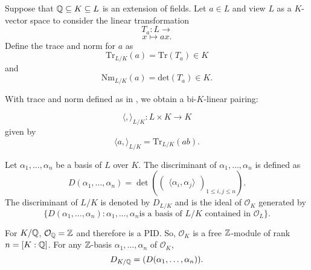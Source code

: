 
\begin{definition}
    Suppose that $\mathbb{Q} \subseteq K \subseteq L$ is an extension of fields. Let $a \in L$ and view $L$ as a $K$-vector space to consider the linear transformation
        \[T_a: L \to \]
        \[x\mapsto ax. \]
    Define the trace and norm for $a$ as
        \[\textrm{Tr}_{L/K}(a) = \textrm{Tr}(T_a) \in K\]
    and
        \[\textrm{Nm}_{L/K}(a) = \textrm{det}(T_a) \in K.\]
\end{definition}

With trace and norm defined as in , we obtain a bi-$K$-linear pairing:

    \[\langle , \rangle_{L/K}: L \times K \to K\]
given by
    \[\langle a, \rangle_{L/K} = \textrm{Tr}_{L/K}(ab).\]
\begin{definition}
    Let $\alpha_1, \ldots, \alpha_n$ be a basis of $L$ over $K$. The discriminant of $\alpha_1, \ldots, \alpha_n$ is defined as
        \[D(\alpha_1, \ldots, \alpha_n) = \det\left(\begin{pmatrix}
            \langle \alpha_i, \alpha_j\rangle
        \end{pmatrix}_{1\leq i,j\leq n}\right).\]
    The discriminant of $L/K$ is denoted by $D_{L/K}$ and is the ideal of $\mathcal{O}_{K}$ generated by
        \[\{D(\alpha_1,\ldots, \alpha_n): \alpha_1, \ldots, \alpha_n \textrm{is a basis of $L/K$ contained in $\mathcal{O}_{L}$}\}.\]
\end{definition}


For $K/\mathbb{Q}$, $\mathcal{O}_{\mathbb{Q}} = \mathbb{Z}$ and therefore is a PID. So, $\mathcal{O}_{K}$ is a free $\mathbb{Z}$-module of rank $n = [K:\mathbb{Q}]$. For any $\mathbb{Z}$-basis $\alpha_1, \ldots, \alpha_n$ of $\mathcal{O}_{K}$,
    \[D_{K/\mathbb{Q}} = (D(\alpha_1, \ldots, \alpha_n)).\]